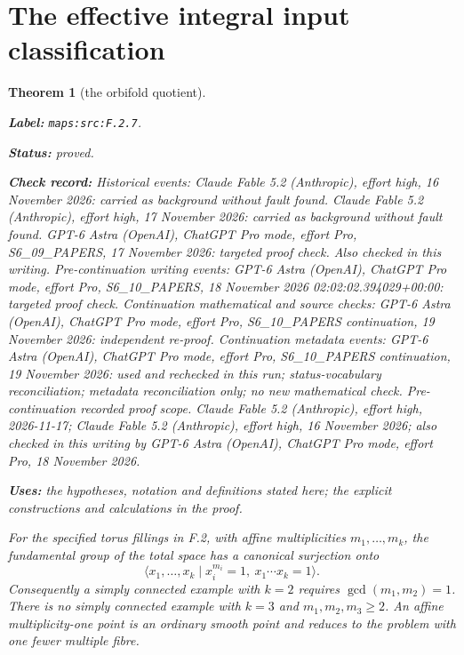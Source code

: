 \documentclass[11pt,a4paper]{article}
\newtheorem{theorem}{Theorem}[section]
\theoremstyle{definition}
\newcommand{\StatementRecord}[4]{\par\smallskip\begingroup\upshape\raggedright\noindent\textbf{Label:} \nolinkurl{#1}.\par\noindent\textbf{Status:} #2.\par\noindent\textbf{Check record:} #3.\par\noindent\textbf{Uses:} #4.\par\endgroup\smallskip}
\begin{document}
\section{The effective integral input classification}



\begin{theorem}[the orbifold quotient]\label{maps:src:F.2.7}
\StatementRecord{maps:src:F.2.7}{proved}{Historical events: Claude Fable 5.2 (Anthropic), effort high, 16 November 2026: carried as background without fault found. Claude Fable 5.2 (Anthropic), effort high, 17 November 2026: carried as background without fault found. GPT-6 Astra (OpenAI), ChatGPT Pro mode, effort Pro, S6\_09\_PAPERS, 17 November 2026: targeted proof check. Also checked in this writing. Pre-continuation writing events: GPT-6 Astra (OpenAI), ChatGPT Pro mode, effort Pro, S6\_10\_PAPERS, 18 November 2026 02:02:02.394029+00:00: targeted proof check. Continuation mathematical and source checks: GPT-6 Astra (OpenAI), ChatGPT Pro mode, effort Pro, S6\_10\_PAPERS continuation, 19 November 2026: independent re-proof. Continuation metadata events: GPT-6 Astra (OpenAI), ChatGPT Pro mode, effort Pro, S6\_10\_PAPERS continuation, 19 November 2026: used and rechecked in this run; status-vocabulary reconciliation; metadata reconciliation only; no new mathematical check. \emph{Pre-continuation recorded proof scope.} Claude Fable 5.2 (Anthropic), effort high, 2026-11-17; Claude Fable 5.2 (Anthropic), effort high, 16 November 2026; also checked in this writing by GPT-6 Astra (OpenAI), ChatGPT Pro mode, effort Pro, 18 November 2026}{the hypotheses, notation and definitions stated here; the explicit constructions and calculations in the proof}


For the specified torus fillings in F.2, with affine
multiplicities $m_1,\ldots,m_k$, the fundamental group of the
total space has a canonical surjection onto
\[
 \langle x_1,\ldots,x_k\mid
       x_i^{m_i}=1,\ x_1\cdots x_k=1\rangle.
 \tag{F.27}\label{maps:eq:F.27}
\]
Consequently a simply connected example with $k=2$ requires
$\gcd(m_1,m_2)=1$.  There is no simply connected example with
$k=3$ and $m_1,m_2,m_3\geq2$.  An affine multiplicity-one
point is an ordinary smooth point and reduces to the problem
with one fewer multiple fibre.

\end{theorem}
\end{document}
